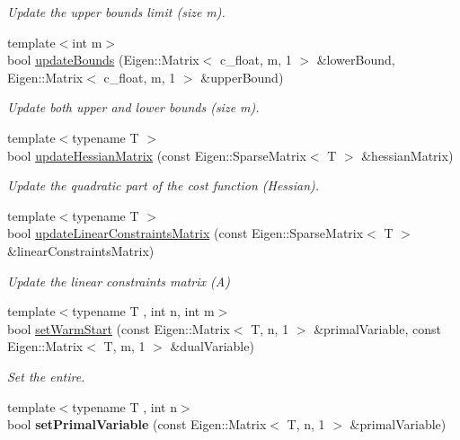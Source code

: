 \begin{DoxyCompactItemize}
\begin{DoxyCompactList}\small\item\em Update the upper bounds limit (size m). \end{DoxyCompactList}\item 
{\footnotesize template$<$int m$>$ }\\bool \mbox{\hyperlink{classOsqpEigen_1_1Solver_a1af39f37500a6bad6896e8e6699880fa}{update\+Bounds}} (Eigen\+::\+Matrix$<$ c\+\_\+float, m, 1 $>$ \&lower\+Bound, Eigen\+::\+Matrix$<$ c\+\_\+float, m, 1 $>$ \&upper\+Bound)
\begin{DoxyCompactList}\small\item\em Update both upper and lower bounds (size m). \end{DoxyCompactList}\item 
{\footnotesize template$<$typename T $>$ }\\bool \mbox{\hyperlink{classOsqpEigen_1_1Solver_a3380601ced1a2db8b226f7a32e5dd6b3}{update\+Hessian\+Matrix}} (const Eigen\+::\+Sparse\+Matrix$<$ T $>$ \&hessian\+Matrix)
\begin{DoxyCompactList}\small\item\em Update the quadratic part of the cost function (Hessian). \end{DoxyCompactList}\item 
{\footnotesize template$<$typename T $>$ }\\bool \mbox{\hyperlink{classOsqpEigen_1_1Solver_a4eb3a0b2bec16b00dfc8334d4ff9ab8d}{update\+Linear\+Constraints\+Matrix}} (const Eigen\+::\+Sparse\+Matrix$<$ T $>$ \&linear\+Constraints\+Matrix)
\begin{DoxyCompactList}\small\item\em Update the linear constraints matrix (A) \end{DoxyCompactList}\item 
{\footnotesize template$<$typename T , int n, int m$>$ }\\bool \mbox{\hyperlink{classOsqpEigen_1_1Solver_a13f8e53aae03e483fa46066c7b93e066}{set\+Warm\+Start}} (const Eigen\+::\+Matrix$<$ T, n, 1 $>$ \&primal\+Variable, const Eigen\+::\+Matrix$<$ T, m, 1 $>$ \&dual\+Variable)
\begin{DoxyCompactList}\small\item\em Set the entire. \end{DoxyCompactList}\item 
\mbox{\label{classOsqpEigen_1_1Solver_a6665f91ac8c073b753cba4af1aad606e}} 
{\footnotesize template$<$typename T , int n$>$ }\\bool {\bfseries set\+Primal\+Variable} (const Eigen\+::\+Matrix$<$ T, n, 1 $>$ \&primal\+Variable)

\end{DoxyCompactItemize}
